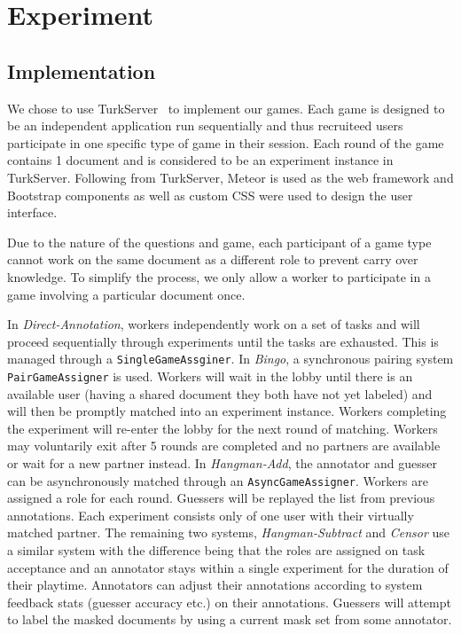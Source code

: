 \documentclass[chi_draft]{sigchi}
\begin{document}
\section{Experiment}
\subsection{Implementation}
We chose to use TurkServer~\cite{parkes2012turkserver} to implement our games. Each game is designed to be an independent application run sequentially and thus recruiteed users participate in one specific type of game in their session. Each round of the game contains 1 document and is considered to be an experiment instance in TurkServer. Following from TurkServer, Meteor is used as the web framework and Bootstrap components as well as custom CSS were used to design the user interface. 

Due to the nature of the questions and game, each participant of a game type cannot work on the same document as a different role to prevent carry over knowledge. To simplify the process, we only allow a worker to participate in a game involving a particular document once.

In \emph{Direct-Annotation}, workers independently work on a set of tasks and will proceed sequentially through experiments until the tasks are exhausted. This is managed through a \texttt{SingleGameAssginer}. In \emph{Bingo}, a synchronous pairing system \texttt{PairGameAssigner} is used. Workers will wait in the lobby until there is an available user (having a shared document they both have not yet labeled) and will then be promptly matched into an experiment instance. Workers completing the experiment will re-enter the lobby for the next round of matching. Workers may voluntarily exit after 5 rounds are completed and no partners are available or wait for a new partner instead. In \emph{Hangman-Add}, the annotator and guesser can be asynchronously matched through an \texttt{AsyncGameAssigner}. Workers are assigned a role for each round. Guessers will be replayed the list from previous annotations. Each experiment consists only of one user with their virtually matched partner.  The remaining two systems, \emph{Hangman-Subtract} and \emph{Censor} use a similar system with the difference being that the roles are assigned on task acceptance and an annotator stays within a single experiment for the duration of their playtime. Annotators can adjust their annotations according to system feedback stats (guesser accuracy etc.) on their annotations. Guessers will attempt to label the masked documents by using a current mask set from some annotator.
\end{document}
